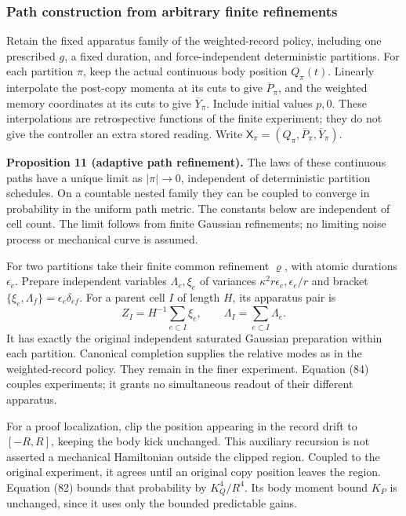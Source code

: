 \documentclass[11pt,a4paper]{article}
\begin{document}
\hypertarget{path-construction-from-arbitrary-finite-refinements}{%
\subsubsection{Path construction from arbitrary finite
refinements}\label{path-construction-from-arbitrary-finite-refinements}}

Retain the fixed apparatus family of the weighted-record policy,
including one prescribed \(g\), a fixed duration, and force-independent
deterministic partitions. For each partition \(\pi\), keep the actual
continuous body position \(Q_\pi(t)\). Linearly interpolate the
post-copy momenta at its cuts to give \(\overline P_\pi\), and the
weighted memory coordinates at its cuts to give \(\overline Y_\pi\).
Include initial values \(p,0\). These interpolations are retrospective
functions of the finite experiment; they do not give the controller an
extra stored reading. Write
\(\mathsf X_\pi=(Q_\pi,\overline P_\pi,\overline Y_\pi)\).

\textbf{Proposition 11 (adaptive path refinement).} The laws of these
continuous paths have a unique limit as \(|\pi|\to0\), independent of
deterministic partition schedules. On a countable nested family they can
be coupled to converge in probability in the uniform path metric. The
constants below are independent of cell count. The limit follows from
finite Gaussian refinements; no limiting noise process or mechanical
curve is assumed.

For two partitions take their finite common refinement \(\varrho\), with
atomic durations \(\epsilon_e\). Prepare independent variables
\(\Lambda_e,\xi_e\) of variances \(\kappa^2r\epsilon_e, \epsilon_e/r\)
and bracket \(\{\xi_e,\Lambda_f\}=\epsilon_e\delta_{ef}\). For a parent
cell \(I\) of length \(H\), its apparatus pair is
\[Z_I=H^{-1}\sum_{e\subset I}\xi_e,\qquad
\Lambda_I=\sum_{e\subset I}\Lambda_e.\tag{84}\] It has exactly the
original independent saturated Gaussian preparation within each
partition. Canonical completion supplies the relative modes as in the
weighted-record policy. They remain in the finer experiment. Equation
(84) couples experiments; it grants no simultaneous readout of their
different apparatus.

For a proof localization, clip the position appearing in the record
drift to \([-R,R]\), keeping the body kick unchanged. This auxiliary
recursion is not asserted a mechanical Hamiltonian outside the clipped
region. Coupled to the original experiment, it agrees until an original
copy position leaves the region. Equation (82) bounds that probability
by \(K_Q^4/R^4\). Its body moment bound \(K_P\) is unchanged, since it
uses only the bounded predictable gains.
\end{document}
